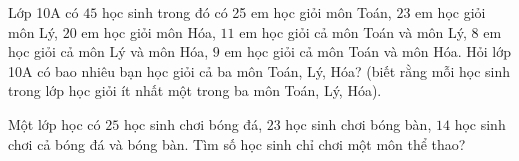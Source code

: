 \begin{ex}%
	Lớp 10A có $45$ học sinh trong đó có 25 em học giỏi môn Toán, $23$ em học giỏi môn Lý, $20$ em học giỏi môn Hóa, $11$ em học giỏi cả môn Toán và môn Lý, $8$ em học giỏi cả môn Lý và môn Hóa, $9$ em học giỏi cả môn Toán và môn Hóa. Hỏi lớp 10A có bao nhiêu bạn học giỏi cả ba môn Toán, Lý, Hóa? (biết rằng mỗi học sinh trong lớp học giỏi ít nhất một trong ba môn Toán, Lý, Hóa).
\end{ex}
%
\begin{ex}%
	Một lớp học có $25$ học sinh chơi bóng đá, $23$ học sinh chơi bóng bàn, $14$ học sinh chơi cả bóng đá và bóng bàn. Tìm số học sinh chỉ chơi một môn thể thao?
\end{ex}
